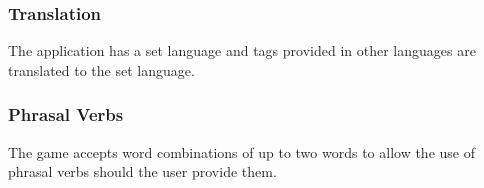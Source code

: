 \subsubsection{Translation}
\label{g14:sec:concepts:linguistics:translation}
The application has a set language and tags provided in other languages are translated to the set language.


\subsubsection{Phrasal Verbs}
\label{g14:sec:concepts:linguistics:phraselverbs}
The game accepts word combinations of up to two words to allow the use of phrasal verbs should the user provide them.

